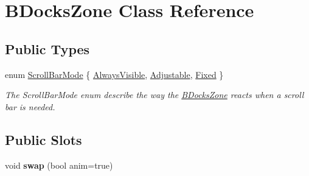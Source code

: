 \hypertarget{class_b_docks_zone}{\section{\-B\-Docks\-Zone \-Class \-Reference}
\label{class_b_docks_zone}
}
\subsection*{\-Public \-Types}
\begin{DoxyCompactItemize}
\item 
enum \hyperlink{class_b_docks_zone_aaa04c632b39dce77b61a3a28b7418fdd}{\-Scroll\-Bar\-Mode} \{ \hyperlink{class_b_docks_zone_aaa04c632b39dce77b61a3a28b7418fdda56cc1afb42c3bd98e3e64599883383a5}{\-Always\-Visible}, 
\hyperlink{class_b_docks_zone_aaa04c632b39dce77b61a3a28b7418fdda4907ef1b3e3b8174073ec707a9753105}{\-Adjustable}, 
\hyperlink{class_b_docks_zone_aaa04c632b39dce77b61a3a28b7418fddae1dd9bb823904efc8224bffef1fe6f22}{\-Fixed}
 \}
\begin{DoxyCompactList}\small\item\em \-The \-Scroll\-Bar\-Mode enum describe the way the \hyperlink{class_b_docks_zone}{\-B\-Docks\-Zone} reacts when a scroll bar is needed. \end{DoxyCompactList}\end{DoxyCompactItemize}
\subsection*{\-Public \-Slots}
\begin{DoxyCompactItemize}
\item 
\hypertarget{class_b_docks_zone_a41a7757fb2b8b4cc5c27f9d5a0e3a841}{void {\bfseries swap} (bool anim=true)}\label{class_b_docks_zone_a41a7757fb2b8b4cc5c27f9d5a0e3a841}

\end{DoxyCompactItemize}
